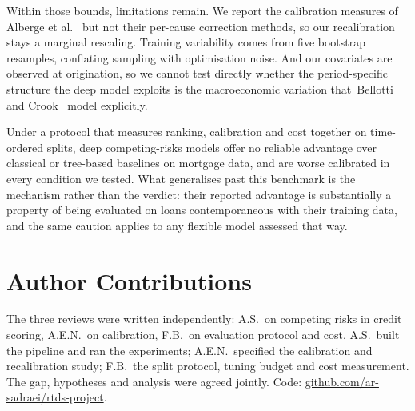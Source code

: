 \documentclass[11pt,journal]{IEEEtran}
\begin{document}
Within those bounds, limitations remain. We report the calibration measures of
Alberge et al.~\cite{alberge2026calibration} but not their per-cause correction
methods, so our recalibration stays a marginal rescaling. Training variability
comes from five bootstrap resamples, conflating sampling with optimisation
noise. And our covariates are observed at origination, so we cannot test
directly whether the period-specific structure the deep model exploits is the
macroeconomic variation that~Bellotti and
Crook~\cite{DBLP:journals/jors/BellottiC09} model explicitly.

Under a protocol that measures ranking, calibration and cost together on
time-ordered splits, deep competing-risks models offer no reliable advantage
over classical or tree-based baselines on mortgage data, and are worse
calibrated in every condition we tested. What generalises past this benchmark is
the mechanism rather than the verdict: their reported advantage is substantially
a property of being evaluated on loans contemporaneous with their training data,
and the same caution applies to any flexible model assessed that way.

\section*{Author Contributions}
The three reviews were written independently: A.S.\ on competing risks in
credit scoring, A.E.N.\ on calibration, F.B.\ on evaluation protocol and cost.
A.S.\ built the pipeline and ran the experiments; A.E.N.\ specified the
calibration and recalibration study; F.B.\ the split protocol, tuning budget and
cost measurement. The gap, hypotheses and analysis were agreed jointly. Code:
\url{github.com/ar-sadraei/rtds-project}.




\end{document}
